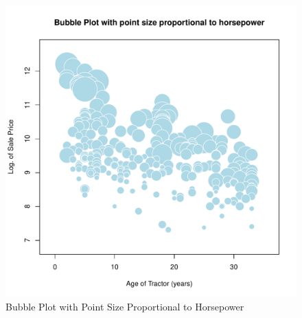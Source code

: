 \documentclass[11pt]{book}
\begin{document}
\begin{figure}[h!]
  \centering
  \includegraphics[scale = 0.5, keepaspectratio=true]{../Figures/bubble_plot}
  \caption{Bubble Plot with Point Size Proportional to Horsepower} \label{fig:bubble_plot}
\end{figure}




\end{document}
